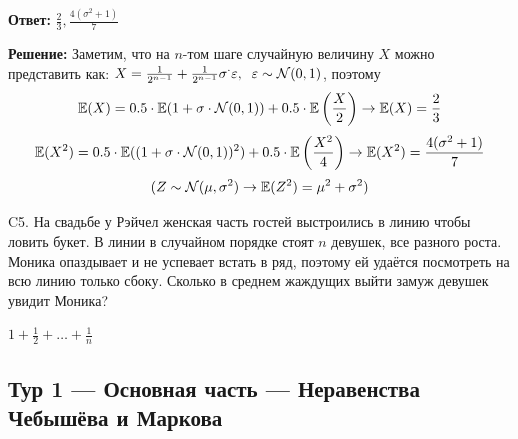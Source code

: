 \begin{enumerate}
\begin{problem}
\begin{sol}
\textbf{Ответ:} $\frac{2}{3},\frac{4(\sigma^2+1)}{7}$

\textbf{Решение:} Заметим, что на $n$-том шаге случайную величину $X$ можно представить как: $X = \frac{1}{2^{n-1}}+\frac{1}{2^{n-1}}\sigma^\cdot\varepsilon,\;\; \varepsilon\sim \mathcal{N}(0,1)$, поэтому
\[
\mathbb{E}(X)= 0.5\cdot \mathbb{E}(1+\sigma\cdot \mathcal{N}(0,1)) + 0.5\cdot \mathbb{E}\left(\frac{X}{2}\right)   \rightarrow \mathbb{E}(X)=\frac{2}{3}
\]
\[
\mathbb{E}(X^2)= 0.5\cdot \mathbb{E}((1+\sigma\cdot \mathcal{N}(0,1))^2) + 0.5\cdot \mathbb{E}\left(\frac{X^2}{4}\right)
\rightarrow \mathbb{E}(X^2)=\frac{4(\sigma^2+1)}{7}
\]
\[
(Z\sim \mathcal{N}(\mu,\sigma^2)\rightarrow \mathbb{E}(Z^2)=\mu^2 + \sigma^2)
\]
\end{sol}
\end{problem}


\begin{problem}
\item[C5.] На свадьбе у Рэйчел женская часть гостей выстроились в линию чтобы ловить букет. В линии в случайном порядке стоят $n$ девушек, все разного роста. Моника  опаздывает и не успевает встать в ряд, поэтому ей удаётся посмотреть на всю линию только сбоку. Сколько в среднем жаждущих выйти замуж девушек увидит Моника? 

\begin{sol}
$1+\frac{1}{2}+\dots+\frac{1}{n}$
\end{sol}
\end{problem}
\end{enumerate}

\newpage
\subsection{Тур 1 — Основная часть — Неравенства Чебышёва и Маркова}


